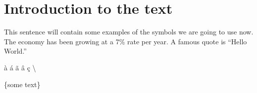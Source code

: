 \documentclass[12pt, twoside]{article}
\begin{document}
\section{Introduction to the text}

This sentence will contain some examples of the symbols we are going to use now. The economy has been growing at a 7\% rate per year. A famous quote is ``Hello World.'' 

\` a
\' a
\~ a
\^ a
\c c
\textbackslash %

\{some text\}
\end{document}
